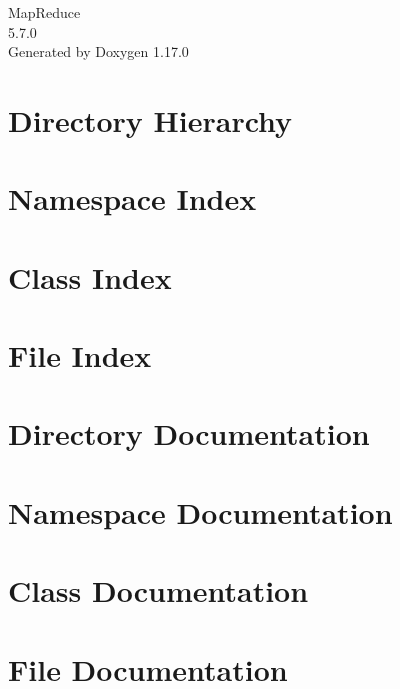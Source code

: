 \documentclass[twoside]{book}
\newcommand{\+}{\discretionary{\mbox{\scriptsize$\hookleftarrow$}}{}{}}
\newcommand{\clearemptydoublepage}{%
    \newpage{\pagestyle{empty}\cleardoublepage}%
  }
\begin{document}
  \raggedbottom
    \hypersetup{pageanchor=false,
                bookmarksnumbered=true,
                pdfencoding=unicode
               }
  \begin{titlepage}
  \vspace*{7cm}
  \begin{center}%
  {\Large Map\+Reduce}\\
  [1ex]\large 5.\+7.\+0 \\
  \vspace*{1cm}
  {\large Generated by Doxygen 1.17.0}\\
  \end{center}
  \end{titlepage}
  \clearemptydoublepage
  \tableofcontents
  \clearemptydoublepage
  \hypersetup{pageanchor=true}
\chapter{Directory Hierarchy}

\chapter{Namespace Index}

\chapter{Class Index}

\chapter{File Index}

\chapter{Directory Documentation}

\chapter{Namespace Documentation}

\chapter{Class Documentation}


\chapter{File Documentation}










  \backmatter
  \newpage
  \clearemptydoublepage
  \printindex
\end{document}
